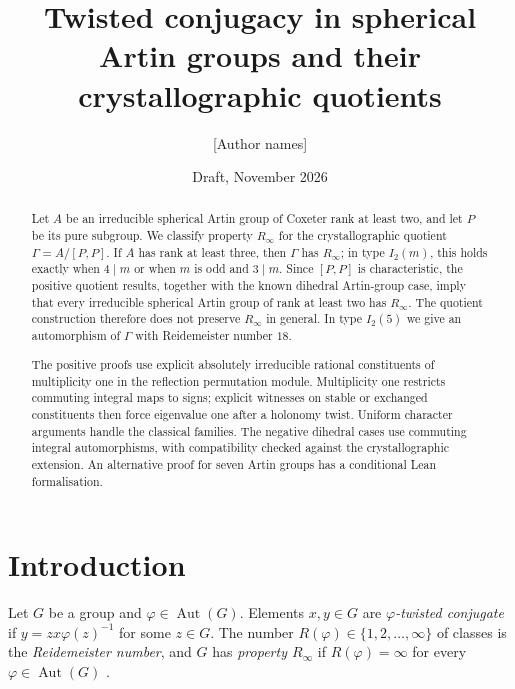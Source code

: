 \documentclass[11pt]{amsart}
\title[Twisted conjugacy in spherical Artin groups]{Twisted conjugacy in spherical Artin groups and their crystallographic quotients}
\author{[Author names]}
\date{Draft, November 2026}
\theoremstyle{definition}
\newcommand{\Aut}{\operatorname{Aut}}
\newcommand{\Rinf}{R_\infty}
\begin{document}
\begin{abstract}
Let $A$ be an irreducible spherical Artin group of Coxeter rank at least two, and let $P$ be its pure subgroup.
We classify property $\Rinf$ for the crystallographic quotient $\Gamma=A/[P,P]$.
If $A$ has rank at least three, then $\Gamma$ has $\Rinf$; in type $I_2(m)$, this holds exactly
when $4\mid m$ or when $m$ is odd and $3\mid m$.
Since $[P,P]$ is characteristic, the positive quotient results, together with the known dihedral
Artin-group case, imply that every irreducible spherical Artin group of rank at least two has $\Rinf$.
The quotient construction therefore does not preserve $\Rinf$ in general. In type $I_2(5)$ we give
an automorphism of $\Gamma$ with Reidemeister number $18$.

The positive proofs use explicit absolutely irreducible rational constituents of multiplicity one
in the reflection permutation module. Multiplicity one restricts commuting integral maps to signs; explicit witnesses on stable
or exchanged constituents then force eigenvalue one after a holonomy twist.
Uniform character arguments handle the classical families. The negative dihedral cases use commuting
integral automorphisms, with compatibility checked against the crystallographic extension.
An alternative proof for seven Artin groups has a conditional Lean formalisation.
\end{abstract}

\maketitle

\section{Introduction}

Let $G$ be a group and $\varphi\in\Aut(G)$. Elements $x,y\in G$ are \emph{$\varphi$-twisted conjugate} if
$y=zx\varphi(z)^{-1}$ for some $z\in G$. The number $R(\varphi)\in\{1,2,\dots,\infty\}$ of classes is the
\emph{Reidemeister number}, and $G$ has \emph{property $\Rinf$} if $R(\varphi)=\infty$ for every
$\varphi\in\Aut(G)$ \cite{FT15,FN16}.
\end{document}
